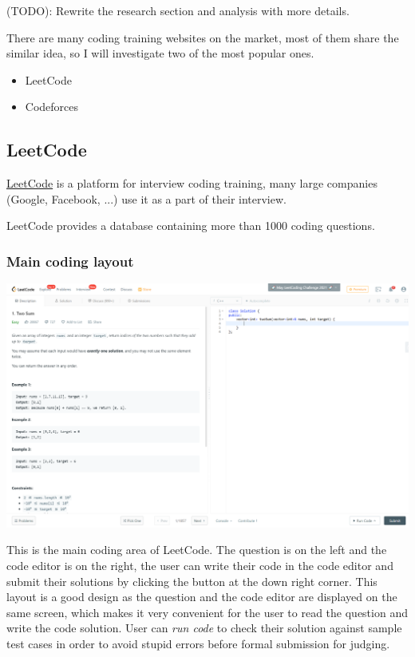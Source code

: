\documentclass[a4paper]{report}
\begin{document}
(TODO): Rewrite the research section and analysis with more details.

There are many coding training websites on the market, most of them share the similar idea, so I will investigate two of the most popular ones.

\begin{itemize}
    \item LeetCode
    \item Codeforces
\end{itemize}

\subsection{LeetCode}

\href{https://leetcode.com/}{LeetCode} is a platform for interview coding training, many large companies (Google, Facebook, ...) use it as a part of their interview.

LeetCode provides a database containing more than 1000 coding questions.

\subsubsection{Main coding layout}
\includegraphics[width=\linewidth]{Two-Sum-LeetCode-Coding}

This is the main coding area of LeetCode. The question is on the left and the code editor is on the right, the user can write their code in the code editor and submit their solutions by clicking the button at the down right corner. This layout is a good design as the question and the code editor are displayed on the same screen, which makes it very convenient for the user to read the question and write the code solution. User can \emph{run code} to check their solution against sample test cases in order to avoid stupid errors before formal submission for judging.
\end{document}
